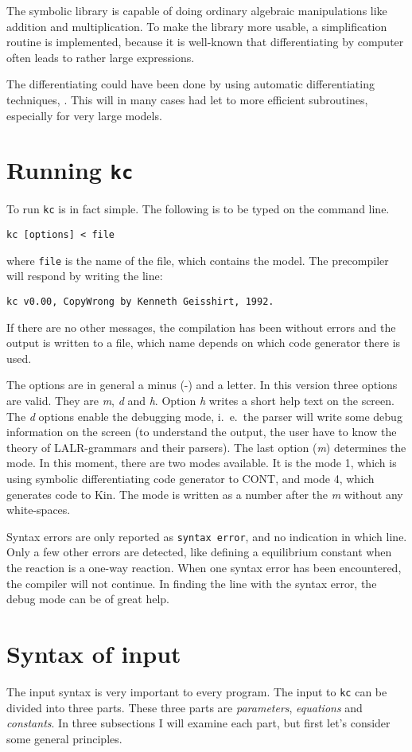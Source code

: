 The symbolic library is capable of doing ordinary algebraic manipulations like
addition and multiplication. To make the library more usable, a simplification routine
is implemented, because it is well-known that differentiating by computer often leads
to rather large expressions.

The differentiating could have been done by using automatic differentiating techniques, \cite{autodiff}. This will 
in many cases had let to more efficient subroutines, especially for very large models. 

\section{Running {\tt kc}}
To run {\tt kc} is in fact simple. The following is to be typed on the command
line.
\begin{verbatim}
kc [options] < file
\end{verbatim}
where {\tt file} is the name of the file, which contains the model. The precompiler
will respond by writing the line:
\begin{verbatim}
kc v0.00, CopyWrong by Kenneth Geisshirt, 1992.
\end{verbatim}
If there are no other messages, the compilation has been without errors and the output is written
to a file, which name depends on which code generator there is used. 

The options are in general a minus (-) and a letter. In this version three options are valid. They are 
{\em m}, {\em d} and {\em h}. Option {\em h} writes a short help text on the screen. The {\em d}
options enable the debugging mode, i.~e.~the parser will write some debug information on
the screen (to understand the output, the user have to know the theory of LALR-grammars
and their parsers). The last option ({\em m}) determines the mode. In this moment, there
are two modes available. It is the mode 1, which is using symbolic differentiating 
code generator to CONT,
and mode 4, which generates code to Kin.
The mode is written as a number after the {\em m} without
any white-spaces.

Syntax errors are only reported as {\tt syntax error}, and no indication in which line. Only a 
few other errors are detected, like defining a equilibrium constant when the reaction is a one-way
reaction.
When one syntax error has been encountered, the compiler will not continue. In finding the line
with the syntax error, the debug mode can be of great help.

\section{Syntax of input}
The input syntax is very important to every program. The input to {\tt kc} can be divided
into three parts. These three parts are {\em parameters}, {\em equations} and {\em 
constants}.
In three subsections I will examine each part, but first let's consider some
general principles.

